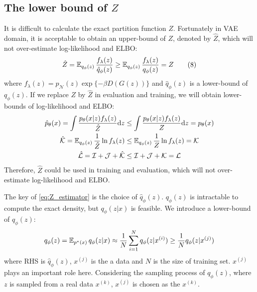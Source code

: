 \subsection{The lower bound of $Z$}\label{subsec:determine_z}

It is difficult to calculate the exact partition function $Z$. Fortunately in VAE domain, it is acceptable to obtain an upper-bound of $Z$, denoted by $\hat{Z}$, which will not over-estimate log-likelihood and ELBO:
\begin{align*}\label{eq:Z_estimator}
    \hat{Z} = \operatorname{\mathbb{E}}_{q_\phi(z)} \frac{f_\lambda(z)}{\hat{q}_\phi(z)} \geq
	\operatorname{\mathbb{E}}_{q_\phi(z)}\frac{f_\lambda(z)}{q_\phi(z)} = Z \tag{8}
\end{align*}
where $f_\lambda(z) = p_\mathcal{N}(z) \exp\{- \beta D(G(z))\}$ and $\hat{q}_\phi(z)$ is a lower-bound of $q_\phi(z)$. If we replace $Z$ by $\hat{Z}$ in evaluation and training, we will obtain lower-bounds of log-likelihood and ELBO:
\begin{align*}
	\hat{p}_\theta(x) = \int \frac{p_\theta(x|z) f_\lambda(z)}{\hat{Z}}  \mathrm{d} z &\leq \int \frac{p_\theta(x|z) f_\lambda(z)}{Z} \mathrm{d} z = p_\theta(x)  \\
	\mathcal{\hat{K}} = \operatorname{\mathbb{E}}_{q_\phi(z)} \frac{1}{\hat{Z}}\ln f_\lambda(z) &\leq \operatorname{\mathbb{E}}_{q_\phi(z)} \frac{1}{Z} \ln f_\lambda(z) = \mathcal{K}   \\
    \mathcal{\hat{L}} =  \mathcal{I} + \mathcal{J} + \mathcal{\hat{K}} &\leq \mathcal{I} + \mathcal{J} + \mathcal{K} = \mathcal{L}
\end{align*}
Therefore, $\hat{Z}$ could be used in training and evaluation, which will not over-estimate log-likelihood and ELBO. 

The key of \cref{eq:Z_estimator} is the choice of $\hat{q}_\phi(z)$. $q_\phi(z)$ is intractable to compute the exact density, but $q_\phi(z|x)$ is feasible. We introduce a lower-bound of  $q_\phi(z)$:
\begin{equation*}
	q_\phi(z) = \operatorname{\mathbb{E}}_{p^*(x)} q_\phi(z|x) \approx \frac{1}{N}\sum_{i=1}^N q_\phi(z|x^{(i)}) \geq \frac{1}{N} q_\phi(z|x^{(j)})
\end{equation*}
where RHS is $\hat{q}_\phi(z)$, $x^{(j)}$ is the a data and $N$ is the size of training set. $x^{(j)}$ plays an important role here. Considering the sampling process of $q_\phi(z)$, where $z$ is sampled from a real data $x^{(k)}$, $x^{(j)}$ is chosen as the $x^{(k)}$. 

